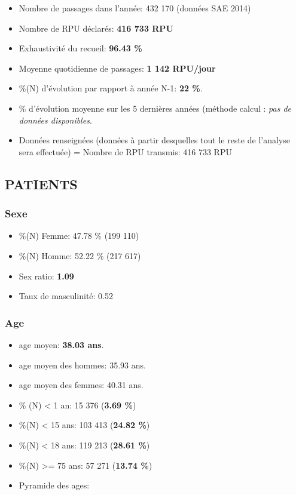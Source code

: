 \documentclass[]{article}
\begin{document}
\begin{itemize}
\itemsep1pt\parskip0pt
\item
  Nombre de passages dans l'année: 432 170 (données SAE 2014)
\item
  Nombre de RPU déclarés: \textbf{416 733 RPU}
\item
  Exhaustivité du recueil: \textbf{96.43 \%}
\item
  Moyenne quotidienne de passages: \textbf{1 142 RPU/jour}
\item
  \%(N) d'évolution par rapport à année N-1: \textbf{22 \%}.
\item
  \% d'évolution moyenne sur les 5 dernières années (méthode calcul :
  \emph{pas de données disponibles}.
\item
  Données renseignées (données à partir desquelles tout le reste de
  l'analyse sera effectuée) = Nombre de RPU transmis: 416 733 RPU
\end{itemize}

\subsection{PATIENTS}\label{patients}

\subsubsection{Sexe}\label{sexe}

\begin{itemize}
\itemsep1pt\parskip0pt
\item
  \%(N) Femme: 47.78 \% (199 110)
\item
  \%(N) Homme: 52.22 \% (217 617)
\item
  Sex ratio: \textbf{1.09}
\item
  Taux de masculinité: 0.52
\end{itemize}

\subsubsection{Age}\label{age}

\begin{itemize}
\item
  age moyen: \textbf{38.03 ans}.
\item
  age moyen des hommes: 35.93 ans.
\item
  age moyen des femmes: 40.31 ans.
\item
  \% (N) \textless{} 1 an: 15 376 (\textbf{3.69 \%})
\item
  \%(N) \textless{} 15 ans: 103 413 (\textbf{24.82 \%})
\item
  \%(N) \textless{} 18 ans: 119 213 (\textbf{28.61 \%})
\item
  \%(N) \textgreater{}= 75 ans: 57 271 (\textbf{13.74 \%})
\item
  Pyramide des ages:
\end{itemize}
\end{document}
